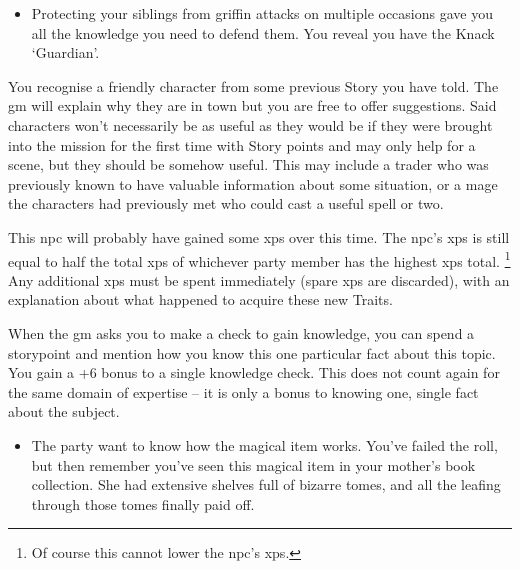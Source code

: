 \begin{multicols}{2}
\begin{itemize}
\item Protecting your siblings from griffin attacks on multiple occasions gave you all the knowledge you need to defend them.
You reveal you have the Knack `Guardian'.
\end{itemize}

\label{oldnpc}
You recognise a friendly character from some previous Story you have told.
The \gls{gm} will explain why they are in town but you are free to offer suggestions.
Said characters won't necessarily be as useful as they would be if they were brought into the mission for the first time with Story points and may only help for a scene, but they should be somehow useful.
This may include a trader who was previously known to have valuable information about some situation, or a mage the characters had previously met who could cast a useful spell or two.

This \gls{npc} will probably have gained some \glspl{xp} over this time.
The \gls{npc}'s \glspl{xp} is still equal to half the total \glspl{xp} of whichever party member has the highest \glspl{xp} total.
\footnote{Of course this cannot lower the \gls{npc}'s \glspl{xp}.}%
Any additional \glspl{xp} must be spent immediately (spare \glspl{xp} are discarded), with an explanation about what happened to acquire these new Traits.

When the \gls{gm} asks you to make a check to gain knowledge, you can spend a \gls{storypoint} and mention how you know this one particular fact about this topic.
You gain a +6 bonus to a single knowledge check.
This does not count again for the same domain of expertise -- it is only a bonus to knowing one, single fact about the subject.

\begin{itemize}
\item
The party want to know how the magical item works.
You've failed the roll, but then remember you've seen this magical item in your mother's book collection.
She had extensive shelves full of bizarre tomes, and all the leafing through those tomes finally paid off.
\iftoggle{aif}{
    \item
    Once, in the \gls{shatteredcastle}, you overheard two guards talking with each other about a door in the hub.
    You know it's in Whiteplains somewhere, and their talk of elves gave you a rough idea of the location.
  \item
  It was unclear if the noble was telling the truth, but you recognise the dyes on his tunic; they come only from the Shale, which can only mean one thing\ldots
}{
  \item
  The party have you idea where they are, but you suddenly remember your uncle's maps.
  They were always plastered all over the walls, and you used to imagine walking in those distant lands.
}
\end{itemize}


\end{multicols}
